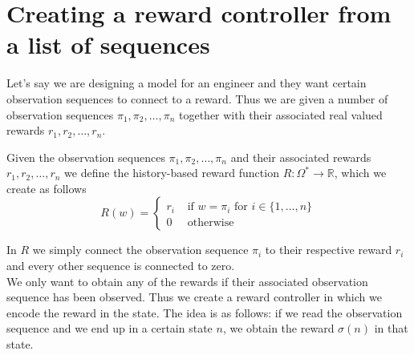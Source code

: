 \section{Creating a reward controller from a list of sequences}
Let's say we are designing a model for an engineer and they want certain observation sequences to connect to a reward. Thus we are given a number of observation sequences $\pi_1,\pi_2,\dots,\pi_n$ together with their associated real valued rewards $r_1,r_2,\dots,r_n$. 
\begin{definition}
Given the observation sequences $\pi_1,\pi_2,\dots,\pi_n$ and their associated rewards $r_1,r_2,\dots,r_n$ we define the history-based reward function $R:\Omega^*\to\mathbb{R}$, which we create as follows
\[R(w) = \begin{cases}
	r_i &\text{ if } w=\pi_i \text { for } i\in \{1,\dots,n\} \\
	0   &\text{ otherwise}
	\end{cases}\]
	\label{d:created_reward_function}
\end{definition}
In $R$ we simply connect the observation sequence $\pi_i$ to their respective reward $r_i$ and every other sequence is connected to zero.\\

We only want to obtain any of the rewards if their associated observation sequence has been observed. Thus we create a reward controller in which we encode the reward in the state. The idea is as follows: if we read the observation sequence and we end up in a certain state $n$, we obtain the reward $\sigma(n)$ in that state. 

